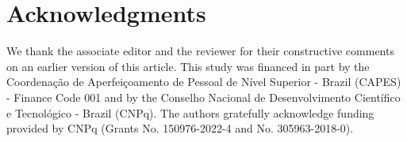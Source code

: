 \section*{Acknowledgments}

We thank the associate editor and the reviewer for their constructive comments on an earlier version
of this article. This study was financed in part by the Coordenação de Aperfeiçoamento de Pessoal de Nível Superior
- Brazil (CAPES) - Finance Code 001 and by the Conselho Nacional de Desenvolvimento Científico e
Tecnológico - Brazil (CNPq). The authors gratefully acknowledge funding provided by CNPq
(Grants No. 150976-2022-4 and No. 305963-2018-0). 

